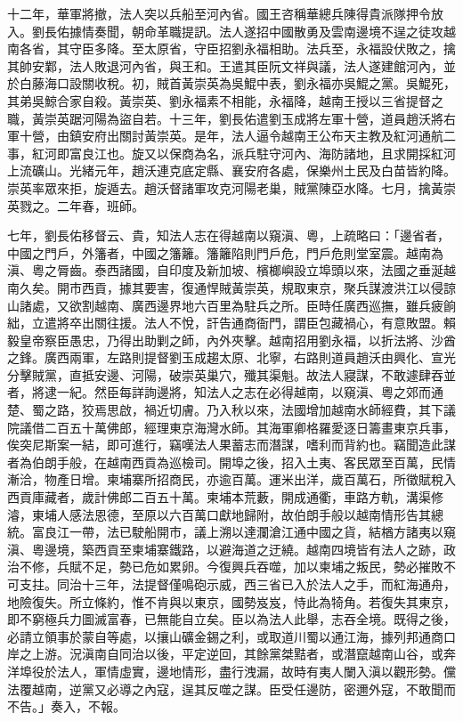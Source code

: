 \begin{pinyinscope}
十二年，華軍將撤，法人突以兵船至河內省。國王咨稱華總兵陳得貴派隊押令放入。劉長佑據情奏聞，朝命革職提訊。法人遂招中國散勇及雲南邊境不逞之徒攻越南各省，其守臣多降。至太原省，守臣招劉永福相助。法兵至，永福設伏敗之，擒其帥安鄴，法人敗退河內省，與王和。王遣其臣阮文祥與議，法人遂建館河內，並於白藤海口設關收稅。初，賊首黃崇英為吳鯤中表，劉永福亦吳鯤之黨。吳鯤死，其弟吳鯨合家自殺。黃崇英、劉永福素不相能，永福降，越南王授以三省提督之職，黃崇英踞河陽為盜自若。十三年，劉長佑遣劉玉成將左軍十營，道員趙沃將右軍十營，由鎮安府出關討黃崇英。是年，法人逼令越南王公布天主教及紅河通航二事，紅河即富良江也。旋又以保商為名，派兵駐守河內、海防諸地，且求開採紅河上流礦山。光緒元年，趙沃連克底定縣、襄安府各處，保樂州土民及白苗皆約降。崇英率眾來拒，旋遁去。趙沃督諸軍攻克河陽老巢，賊黨陳亞水降。七月，擒黃崇英戮之。二年春，班師。

七年，劉長佑移督云、貴，知法人志在得越南以窺滇、粵，上疏略曰：「邊省者，中國之門戶，外籓者，中國之籓籬。籓籬陷則門戶危，門戶危則堂室震。越南為滇、粵之脣齒。泰西諸國，自印度及新加坡、檳榔嶼設立埠頭以來，法國之垂涎越南久矣。開市西貢，據其要害，復通悍賊黃崇英，規取東京，聚兵謀渡洪江以侵諒山諸處，又欲割越南、廣西邊界地六百里為駐兵之所。臣時任廣西巡撫，雖兵疲餉絀，立遣將卒出關往援。法人不悅，訐告通商衙門，謂臣包藏禍心，有意敗盟。賴毅皇帝察臣愚忠，乃得出助剿之師，內外夾擊。越南招用劉永福，以折法將、沙酋之鋒。廣西兩軍，左路則提督劉玉成趨太原、北寧，右路則道員趙沃由興化、宣光分擊賊黨，直抵安邊、河陽，破崇英巢穴，殲其渠魁。故法人寢謀，不敢遽肆吞並者，將逮一紀。然臣每詳詢邊將，知法人之志在必得越南，以窺滇、粵之郊而通楚、蜀之路，狡焉思啟，禍近切膚。乃入秋以來，法國增加越南水師經費，其下議院議借二百五十萬佛郎，經理東京海灣水師。其海軍卿格羅愛逐日籌畫東京兵事，俟突尼斯案一結，即可進行，竊嘆法人果蓄志而潛謀，嗜利而背約也。竊聞造此謀者為伯朗手般，在越南西貢為巡檢司。開埠之後，招入土夷、客民眾至百萬，民情漸洽，物產日增。柬埔寨所招商民，亦逾百萬。運米出洋，歲百萬石，所徵賦稅入西貢庫藏者，歲計佛郎二百五十萬。柬埔本荒藪，開成通衢，車路方軌，溝渠修濬，東埔人感法恩德，至原以六百萬口獻地歸附，故伯朗手般以越南情形告其總統。富良江一帶，法已駛船開市，議上溯以達瀾滄江通中國之貨，結楢方諸夷以窺滇、粵邊境，築西貢至柬埔寨鐵路，以避海道之迂繞。越南四境皆有法人之跡，政治不修，兵賦不足，勢已危如累卵。今復興兵吞噬，加以柬埔之叛民，勢必摧敗不可支拄。同治十三年，法提督僅鳴砲示威，西三省已入於法人之手，而紅海通舟，地險復失。所立條約，惟不肯與以東京，國勢岌岌，恃此為犄角。若復失其東京，即不窮極兵力圖滅富春，已無能自立矣。臣以為法人此舉，志吞全境。既得之後，必請立領事於蒙自等處，以攘山礦金錫之利，或取道川蜀以通江海，據列邦通商口岸之上游。況滇南自同治以後，平定逆回，其餘黨桀黠者，或潛竄越南山谷，或奔洋埠役於法人，軍情虛實，邊地情形，盡行洩漏，故時有夷人闌入滇以觀形勢。儻法覆越南，逆黨又必導之內寇，逞其反噬之謀。臣受任邊防，密邇外寇，不敢聞而不告。」奏入，不報。


\end{pinyinscope}
